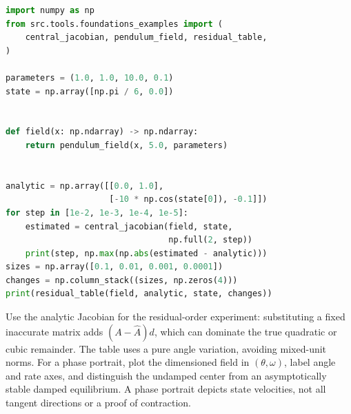 \noindent\begin{minipage}{\linewidth}
\begin{lstlisting}[language=Python,basicstyle=\ttfamily\small]
import numpy as np
from src.tools.foundations_examples import (
    central_jacobian, pendulum_field, residual_table,
)

parameters = (1.0, 1.0, 10.0, 0.1)
state = np.array([np.pi / 6, 0.0])


def field(x: np.ndarray) -> np.ndarray:
    return pendulum_field(x, 5.0, parameters)


analytic = np.array([[0.0, 1.0],
                     [-10 * np.cos(state[0]), -0.1]])
for step in [1e-2, 1e-3, 1e-4, 1e-5]:
    estimated = central_jacobian(field, state,
                                 np.full(2, step))
    print(step, np.max(np.abs(estimated - analytic)))
sizes = np.array([0.1, 0.01, 0.001, 0.0001])
changes = np.column_stack((sizes, np.zeros(4)))
print(residual_table(field, analytic, state, changes))
\end{lstlisting}
\end{minipage}

Use the analytic Jacobian for the residual-order experiment: substituting a fixed inaccurate
matrix adds $(A-\widehat A)d$, which can dominate the true quadratic or cubic remainder.
The table uses a pure angle variation, avoiding mixed-unit norms. For a phase portrait,
plot the dimensioned field in $(\theta,\omega)$, label angle and rate axes, and distinguish
the undamped center from an asymptotically stable damped equilibrium. A phase portrait
depicts state velocities, not all tangent directions or a proof of contraction.

